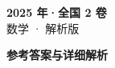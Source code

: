 \documentclass[zihao=-4, a4paper]{ctexart}
\begin{document}
\begin{center}
  {\Large\bfseries 2025 年·全国 2 卷}\\[4pt]
  {\large 数学 · 解析版}
\end{center}
\medskip
{}

\clearpage
{}
\begin{center}{\Large\bfseries 参考答案与详细解析}\end{center}
\medskip

\end{document}

